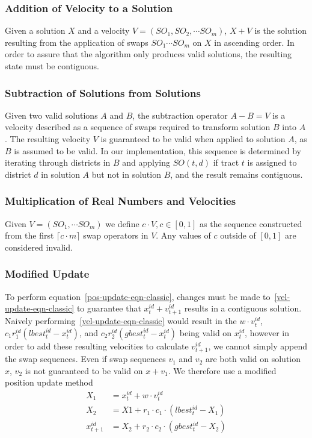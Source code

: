 \documentclass[journal]{IEEEtran}
\begin{document}
\subsubsection{Addition of Velocity to a Solution}
Given a solution $X$ and a velocity $V = (SO_1, SO_2, \cdots SO_m)$, $X + V$ is
the solution resulting from the application of swaps $SO_1 \cdots SO_m$ on $X$
in ascending order.  In order to assure that the algorithm only produces valid
solutions, the resulting state must be contiguous.\\

\subsubsection{Subtraction of Solutions from Solutions}
Given two valid solutions $A$ and $B$, the subtraction operator $A - B = V$ is a
velocity described as a sequence of swaps required to transform solution $B$
into $A$.  The resulting velocity $V$ is guaranteed to be valid when applied to
solution $A$, as $B$ is assumed to be valid.  In our implementation, this
sequence is determined by iterating through districts in $B$ and applying $SO(t,
d)$ if tract $t$ is assigned to district $d$ in solution $A$ but not in solution
$B$, and the result remains contiguous.\\

\subsubsection{Multiplication of Real Numbers and Velocities}
Given $V = (SO_1, \cdots SO_m)$ we define $c \cdot V, c \in [0, 1]$ as the
sequence constructed from the first $\lceil c\cdot m \rceil$ swap operators in
$V$.  Any values of $c$ outside of $[0, 1]$ are considered invalid.\\

\subsubsection{Modified Update}
To perform equation~\ref{pos-update-eqn-classic}, changes must be made
to~\ref{vel-update-eqn-classic} to guarantee that $x_{t}^{id} + v_{t + 1}^{id}$
results in a contiguous solution. Naively
performing~\ref{vel-update-eqn-classic} would result in the $w \cdot v_t^{id}$,
$c_1r_1^{id}(lbest_t^{id} - x_t^{id})$, and $c_2r_2^{id}(gbest_t^{id} -
x_t^{id})$ being valid on $x_t^{id}$, however in order to add these resulting
velocities to calculate $v_{t + 1}^{id}$, we cannot simply append the swap
sequences.  Even if swap sequences $v_1$ and $v_2$ are both valid on solution
$x$, $v_2$ is not guaranteed to be valid on $x + v_1$.  We therefore use a
modified position update method
\begin{equation}
\begin{aligned}
X_1 &= x_{t}^{id} + w \cdot v_{t}^{id}\\
X_2 &= X1 + r_1 \cdot c_1 \cdot (lbest_{t}^{id} - X_1)\\
x_{t + 1}^{id} &= X_2 + r_2 \cdot c_2 \cdot (gbest_t^{id} - X_2)\\
\end{aligned}
\end{equation}
\end{document}
